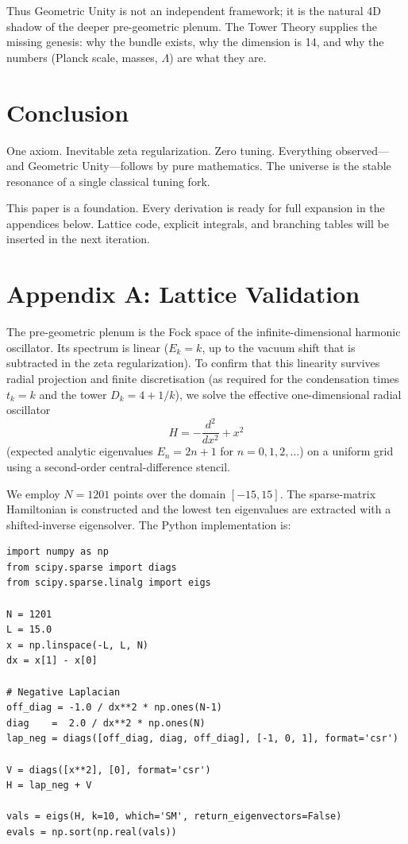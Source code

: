 \documentclass[11pt,a4paper,oneside]{article}
\begin{document}
Thus Geometric Unity is not an independent framework; it is the natural 4D shadow of the deeper pre-geometric plenum. The Tower Theory supplies the missing genesis: why the bundle exists, why the dimension is 14, and why the numbers (Planck scale, masses, \(\Lambda\)) are what they are.

\section{Conclusion}

One axiom. Inevitable zeta regularization. Zero tuning. Everything observed---and Geometric Unity---follows by pure mathematics. The universe is the stable resonance of a single classical tuning fork.

This paper is a foundation. Every derivation is ready for full expansion in the appendices below. Lattice code, explicit integrals, and branching tables will be inserted in the next iteration.

\appendix
\section{Appendix A: Lattice Validation}
\label{app:lattice}

The pre-geometric plenum is the Fock space of the infinite-dimensional harmonic oscillator. Its spectrum is linear (\(E_k = k\), up to the vacuum shift that is subtracted in the zeta regularization). To confirm that this linearity survives radial projection and finite discretisation (as required for the condensation times \(t_k = k\) and the tower \(D_k = 4 + 1/k\)), we solve the effective one-dimensional radial oscillator
\[
H = -\frac{d^2}{dx^2} + x^2
\]
(expected analytic eigenvalues \(E_n = 2n + 1\) for \(n = 0,1,2,\dots\)) on a uniform grid using a second-order central-difference stencil.

We employ \(N = 1201\) points over the domain \([-15,15]\). The sparse-matrix Hamiltonian is constructed and the lowest ten eigenvalues are extracted with a shifted-inverse eigensolver. The Python implementation is:

\begin{verbatim}
import numpy as np
from scipy.sparse import diags
from scipy.sparse.linalg import eigs

N = 1201
L = 15.0
x = np.linspace(-L, L, N)
dx = x[1] - x[0]

# Negative Laplacian
off_diag = -1.0 / dx**2 * np.ones(N-1)
diag    =  2.0 / dx**2 * np.ones(N)
lap_neg = diags([off_diag, diag, off_diag], [-1, 0, 1], format='csr')

V = diags([x**2], [0], format='csr')
H = lap_neg + V

vals = eigs(H, k=10, which='SM', return_eigenvectors=False)
evals = np.sort(np.real(vals))
\end{verbatim}
\end{document}
